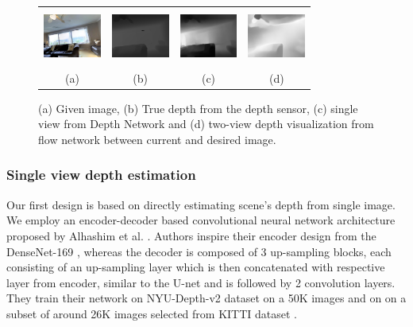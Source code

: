 \documentclass[letterpaper, 10 pt, conference]{ieeeconf}  %
\begin{document}
\begin{figure}
\centering
\begin{tabular}{cccc}
  \includegraphics[width = 1.9cm, height=1.8cm]{comparison/scene_new.png} \hspace{-1em}  & 
  \includegraphics[width = 1.9cm, height=1.8cm]{comparison/depth_sensor_new.png} \hspace{-1em}  &
  \includegraphics[width = 1.9cm, height=1.8cm]{comparison/depth_net_new.png}  \hspace{-1em} &
  \includegraphics[width = 1.9cm, height=1.8cm]{comparison/flow_depth_new.png}  \hspace{-1em} \\
  (a) & (b) & (c) & (d)
\end{tabular}
\caption{(a) Given image, (b) True depth from the depth sensor, (c) single view from Depth Network and (d) two-view depth visualization from flow network between current and desired image.}
\label{fig:depth_comparision}%
\end{figure}

\subsubsection{Single view depth estimation}
Our first design is based on directly estimating scene's depth from single image. We employ an encoder-decoder based convolutional neural network architecture proposed by Alhashim et al. \cite{depthnet}. Authors inspire their encoder design from the DenseNet-169 \cite{densenet}, whereas the decoder is composed of 3 up-sampling blocks, each consisting of an up-sampling layer which is then concatenated with respective layer from encoder, similar to the U-net \cite{unet} and is followed by 2 convolution layers. They train their network on NYU-Depth-v2 dataset  \cite{nyudepthv2} on a 50K images and on  on a subset of around 26K images selected from KITTI dataset \cite{kitti}. %
\end{document}
